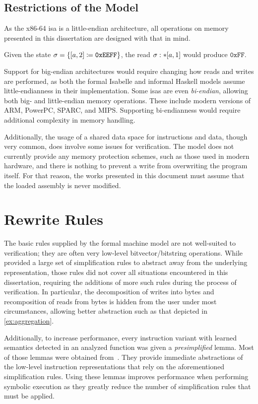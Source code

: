\subsection{Restrictions of the Model}
As the x86-64 \ac{isa} is a little-endian architecture,%
all operations on memory presented in this dissertation
are designed with that in mind.
\begin{example}
  Given the state $\sigma=\{[a,2]\coloneqq\mathtt{0xEEFF}\}$,
  the read $\sigma:\ast[a,1]$ would produce $\mathtt{0xFF}$.
\end{example}
Support for big-endian architectures would require changing how reads and writes%
are performed, as both the formal Isabelle and informal Haskell models
assume little-endianness in their implementation.
Some \acp{isa} are even \emph{bi-endian}, allowing both big- and little-endian%
memory operations. These include modern versions of ARM, PowerPC, SPARC, and MIPS.
Supporting bi-endianness would require additional complexity in memory handling.

Additionally,
the usage of a shared data space for instructions and data, though very common,
does involve some issues for verification.
The model does not currently provide any memory protection schemes,%
such as those used in modern hardware,
and there is nothing to prevent a write from overwriting the program itself.
For that reason, the works presented in this document must assume that the loaded assembly
is never modified.

\section{Rewrite Rules}\label{se:rewrite}
The basic rules supplied by the formal machine model are not well-suited to verification;
they are often very low-level bitvector/bitstring operations.
While \citet{roessle2019} provided a large set of simplification rules
to abstract away from the underlying representation,
those rules did not cover all situations encountered in this dissertation,
requiring the additions of more such rules during the process of verification.
In particular, the decomposition of writes into bytes
and recomposition of reads from bytes is hidden from the user under most circumstances,
allowing better abstraction such as that depicted in \cref{ex:aggregation}.

Additionally, to increase performance,
every instruction variant with learned semantics detected in an analyzed function
was given a \emph{presimplified} lemma.%
Most of those lemmas were obtained from~\citep{verbeek2019refinement}.
They provide immediate abstractions of the low-level instruction representations
that rely on the aforementioned simplification rules.
Using these lemmas improves performance when performing symbolic execution
as they greatly reduce the number of simplification rules that must be applied.

